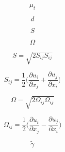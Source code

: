 {\newpage\clearpage
{}%
\begin{displaymath}
\mu_t
\end{displaymath}%
\lthtmldisplayZ
\lthtmlcheckvsize\clearpage}

{\newpage\clearpage
{}%
\begin{displaymath}
d
\end{displaymath}%
\lthtmldisplayZ
\lthtmlcheckvsize\clearpage}

{\newpage\clearpage
{}%
\begin{displaymath}
S
\end{displaymath}%
\lthtmldisplayZ
\lthtmlcheckvsize\clearpage}

{\newpage\clearpage
{}%
\begin{displaymath}
\Omega
\end{displaymath}%
\lthtmldisplayZ
\lthtmlcheckvsize\clearpage}

{\newpage\clearpage
{}%
\begin{displaymath}
S = \sqrt{2 S_{ij} S_{ij}}
\end{displaymath}%
\lthtmldisplayZ
\lthtmlcheckvsize\clearpage}

{\newpage\clearpage
{}%
\begin{displaymath}
S_{ij} = \frac{1}{2}\bigg(\frac{\partial u_i}{\partial x_j} + \frac{\partial u_j}{\partial x_i} \bigg)
\end{displaymath}%
\lthtmldisplayZ
\lthtmlcheckvsize\clearpage}

{\newpage\clearpage
{}%
\begin{displaymath}
\Omega = \sqrt{2 \Omega_{ij} \Omega_{ij}}
\end{displaymath}%
\lthtmldisplayZ
\lthtmlcheckvsize\clearpage}

{\newpage\clearpage
{}%
\begin{displaymath}
\Omega_{ij} = \frac{1}{2}\bigg(\frac{\partial u_i}{\partial x_j} - \frac{\partial u_j}{\partial x_i} \bigg)
\end{displaymath}%
\lthtmldisplayZ
\lthtmlcheckvsize\clearpage}

{\newpage\clearpage
{}%
\begin{displaymath}
\tilde{\gamma}
\end{displaymath}%
\lthtmldisplayZ
\lthtmlcheckvsize\clearpage}


